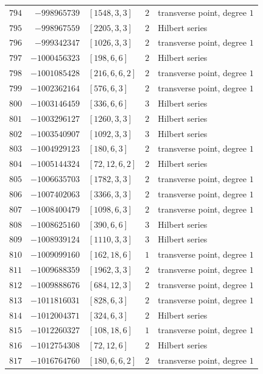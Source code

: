 \documentclass[11pt]{article}
\begin{document}
\begin{center}
\begin{longtable}{r r l c l}
$794$ & $-998965739$ & $[1548,3,3]$ & $2$ & transverse point, degree $1$\\
$795$ & $-998967559$ & $[2205,3,3]$ & $2$ & Hilbert series\\
$796$ & $-999342347$ & $[1026,3,3]$ & $2$ & transverse point, degree $1$\\
$797$ & $-1000456323$ & $[198,6,6]$ & $2$ & Hilbert series\\
$798$ & $-1001085428$ & $[216,6,6,2]$ & $2$ & transverse point, degree $1$\\
$799$ & $-1002362164$ & $[576,6,3]$ & $2$ & transverse point, degree $1$\\
$800$ & $-1003146459$ & $[336,6,6]$ & $3$ & Hilbert series\\
$801$ & $-1003296127$ & $[1260,3,3]$ & $2$ & Hilbert series\\
$802$ & $-1003540907$ & $[1092,3,3]$ & $3$ & Hilbert series\\
$803$ & $-1004929123$ & $[180,6,3]$ & $2$ & transverse point, degree $1$\\
$804$ & $-1005144324$ & $[72,12,6,2]$ & $2$ & Hilbert series\\
$805$ & $-1006635703$ & $[1782,3,3]$ & $2$ & transverse point, degree $1$\\
$806$ & $-1007402063$ & $[3366,3,3]$ & $2$ & transverse point, degree $1$\\
$807$ & $-1008400479$ & $[1098,6,3]$ & $2$ & transverse point, degree $1$\\
$808$ & $-1008625160$ & $[390,6,6]$ & $3$ & Hilbert series\\
$809$ & $-1008939124$ & $[1110,3,3]$ & $3$ & Hilbert series\\
$810$ & $-1009099160$ & $[162,18,6]$ & $1$ & transverse point, degree $1$\\
$811$ & $-1009688359$ & $[1962,3,3]$ & $2$ & transverse point, degree $1$\\
$812$ & $-1009888676$ & $[684,12,3]$ & $2$ & transverse point, degree $1$\\
$813$ & $-1011816031$ & $[828,6,3]$ & $2$ & transverse point, degree $1$\\
$814$ & $-1012004371$ & $[324,6,3]$ & $2$ & Hilbert series\\
$815$ & $-1012260327$ & $[108,18,6]$ & $1$ & transverse point, degree $1$\\
$816$ & $-1012754308$ & $[72,12,6]$ & $2$ & Hilbert series\\
$817$ & $-1016764760$ & $[180,6,6,2]$ & $2$ & transverse point, degree $1$\\

\end{longtable}
\end{center}
\end{document}
